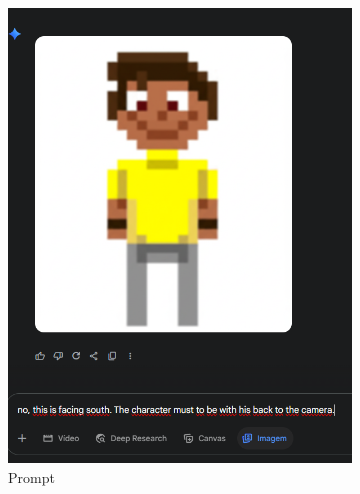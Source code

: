\begin{figure}[htbp]
    \centering
    \caption{\small Processo da geração 2 do sprite em back view no Gemini Pro em julho/2025}
    \label{fig:geminiProBack2}

    \begin{subfigure}{0.5\linewidth}
        \includegraphics[width=1\linewidth]{figs/geminiPro/chat12/tela02.PNG}
        \caption{\small Prompt}
        \label{fig:geminiProBack2Prompt}
    \end{subfigure}
    \begin{subfigure}{0.3\linewidth}

\end{subfigure}
\end{figure}
